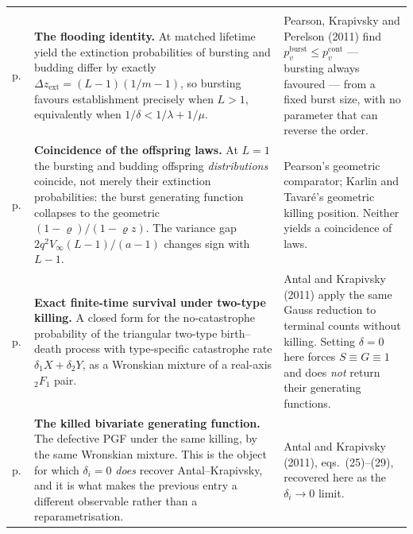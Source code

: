 \vspace{0.35\baselineskip}
{\footnotesize
\begin{xltabular}{\linewidth}{@{}>{\raggedright\arraybackslash}p{20mm}O>{\raggedright\arraybackslash}p{40mm}@{}}
\toprule
{} &  &  \\
\midrule
\endfirsthead
\toprule
{} &  &  \\
\midrule
\endhead
\bottomrule
\endlastfoot

\newline p.\,\pageref{p:thm:flood} &
\textbf{The flooding identity.} At matched lifetime yield the extinction probabilities of
bursting and budding differ by exactly $\Delta z_{\mathrm{ext}}=(L-1)(1/m-1)$, so bursting
favours establishment precisely when $L>1$, equivalently when $1/\delta<1/\lambda+1/\mu$. &
Pearson, Krapivsky and Perelson (2011) find $p_v^{\mathrm{burst}}\le p_v^{\mathrm{cont}}$ ---
bursting always favoured --- from a fixed burst size, with no parameter that can reverse the
order. \\
\addlinespace[3pt]

\newline p.\,\pageref{p:prop:L1} &
\textbf{Coincidence of the offspring laws.} At $L=1$ the bursting and budding offspring
\emph{distributions} coincide, not merely their extinction probabilities: the burst
generating function collapses to the geometric $(1-\varrho)/(1-\varrho z)$. The variance
gap $2q^{2}V_\infty(L-1)/(a-1)$ changes sign with $L-1$. &
Pearson's geometric comparator; Karlin and Tavar\'e's geometric killing position. Neither
yields a coincidence of laws. \\
\addlinespace[3pt]

\newline p.\,\pageref{tt:thm:main} &
\textbf{Exact finite-time survival under two-type killing.} A closed form for the
no-catastrophe probability of the triangular two-type birth--death process with
type-specific catastrophe rate $\delta_1X+\delta_2Y$, as a Wronskian mixture of a
real-axis ${}_2F_1$ pair. &
Antal and Krapivsky (2011) apply the same Gauss reduction to terminal counts without
killing. Setting $\delta=0$ here forces $S\equiv G\equiv1$ and does \emph{not} return
their generating functions. \\
\addlinespace[3pt]

\newline p.\,\pageref{eq:pgf-F1-solution} &
\textbf{The killed bivariate generating function.} The defective PGF under the same
killing, by the same Wronskian mixture. This is the object for which $\delta_i=0$
\emph{does} recover Antal--Krapivsky, and it is what makes the previous entry a different
observable rather than a reparametrisation. &
Antal and Krapivsky (2011), eqs.\ (25)--(29), recovered here as the $\delta_i\to0$ limit. \\
\end{xltabular}\par}


